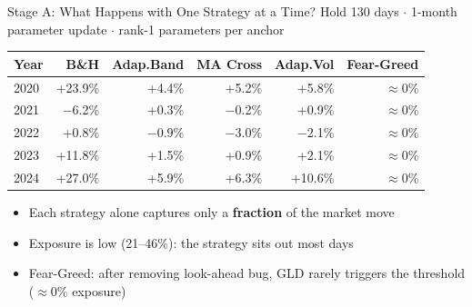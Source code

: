 \documentclass[aspectratio=169]{beamer}
\begin{document}
\begin{frame}{Stage A: What Happens with One Strategy at a Time?}
  \small
  Hold 130 days $\cdot$ 1-month parameter update $\cdot$ rank-1 parameters per anchor

  \vspace{0.5em}
  \begin{tabular}{lrrrrr}
    \toprule
    Year & B\&H & Adap.Band & MA Cross & Adap.Vol & Fear-Greed \\
    \midrule
    2020 & +23.9\% & +4.4\% & +5.2\% & +5.8\% & $\approx$0\% \\
    2021 & $-$6.2\%  & +0.3\% & $-$0.2\% & +0.9\% & $\approx$0\% \\
    2022 & +0.8\%  & $-$0.9\% & $-$3.0\% & $-$2.1\% & $\approx$0\% \\
    2023 & +11.8\% & +1.5\% & +0.9\% & +2.1\% & $\approx$0\% \\
    2024 & +27.0\% & +5.9\% & +6.3\% & +10.6\% & $\approx$0\% \\
    \bottomrule
  \end{tabular}

  \vspace{0.6em}
  \begin{itemize}
    \item Each strategy alone captures only a \textbf{fraction} of the market move
    \item Exposure is low (21--46\%): the strategy sits out most days
    \item Fear-Greed: after removing look-ahead bug, GLD rarely triggers the threshold ($\approx$0\% exposure)
  \end{itemize}
\end{frame}
\end{document}
